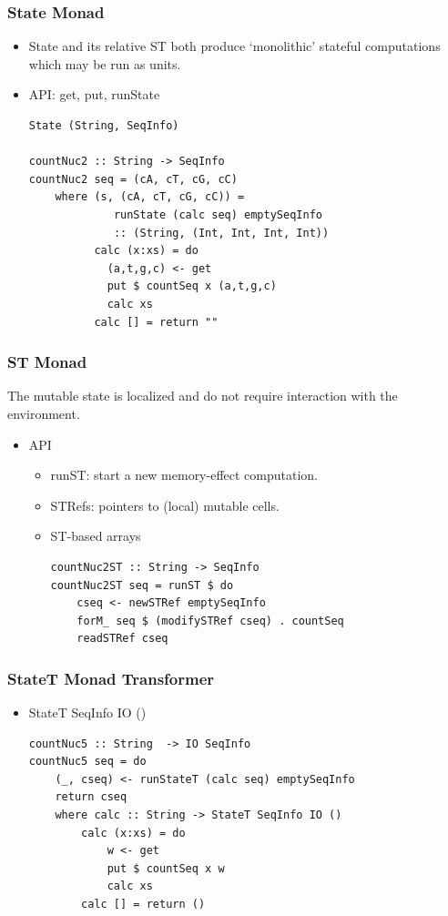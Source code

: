 \begin{frame}[fragile]\frametitle{State Monad}

\begin{itemize}
\item
  State and its relative ST both produce `monolithic' stateful
  computations which may be run as units.
\item
  API: get, put, runState

\begin{verbatim}
State (String, SeqInfo)

countNuc2 :: String -> SeqInfo
countNuc2 seq = (cA, cT, cG, cC)
    where (s, (cA, cT, cG, cC)) = 
             runState (calc seq) emptySeqInfo 
             :: (String, (Int, Int, Int, Int))
          calc (x:xs) = do
            (a,t,g,c) <- get
            put $ countSeq x (a,t,g,c)
            calc xs
          calc [] = return ""
\end{verbatim}
\end{itemize}

\end{frame}

\begin{frame}[fragile]\frametitle{ST Monad}

The mutable state is localized and do not require interaction with the
environment.

\begin{itemize}
\item
  API

  \begin{itemize}
  \item
    runST: start a new memory-effect computation.
  \item
    STRefs: pointers to (local) mutable cells.
  \item
    ST-based arrays

\begin{verbatim}
countNuc2ST :: String -> SeqInfo
countNuc2ST seq = runST $ do
    cseq <- newSTRef emptySeqInfo
    forM_ seq $ (modifySTRef cseq) . countSeq
    readSTRef cseq                                  
\end{verbatim}
  \end{itemize}
\end{itemize}

\end{frame}

\begin{frame}[fragile]\frametitle{StateT Monad Transformer}

\begin{itemize}
\item
  StateT SeqInfo IO ()

\begin{verbatim}
countNuc5 :: String  -> IO SeqInfo  
countNuc5 seq = do
    (_, cseq) <- runStateT (calc seq) emptySeqInfo
    return cseq
    where calc :: String -> StateT SeqInfo IO ()
        calc (x:xs) = do
            w <- get
            put $ countSeq x w
            calc xs
        calc [] = return ()
\end{verbatim}
\end{itemize}

\end{frame}

